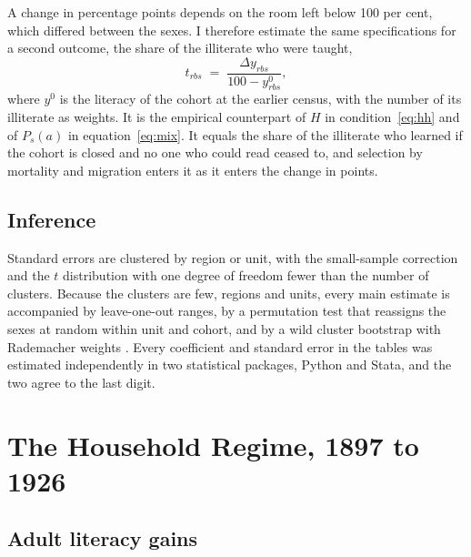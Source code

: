 A change in percentage points depends on the room left below 100 per cent, which differed between the sexes. I therefore estimate the same specifications for a second outcome, the share of the illiterate who were taught,
\begin{equation}\label{eq:taught}
  t_{rbs} \;=\; \frac{\Delta y_{rbs}}{100-y^{0}_{rbs}},
\end{equation}
where $y^{0}$ is the literacy of the cohort at the earlier census, with the number of its illiterate as weights. It is the empirical counterpart of $H$ in condition~\eqref{eq:hh} and of $P_s(a)$ in equation~\eqref{eq:mix}. It equals the share of the illiterate who learned if the cohort is closed and no one who could read ceased to, and selection by mortality and migration enters it as it enters the change in points.

\subsection{Inference}

Standard errors are clustered by region or unit, with the small-sample correction and the $t$ distribution with one degree of freedom fewer than the number of clusters. Because the clusters are few,  regions and  units, every main estimate is accompanied by leave-one-out ranges, by a permutation test that reassigns the sexes at random within unit and cohort, and by a wild cluster bootstrap with Rademacher weights \citep{cameron2008}. Every coefficient and standard error in the tables was estimated independently in two statistical packages, Python and Stata, and the two agree to the last digit.

\FloatBarrier
\section{The Household Regime, 1897 to 1926}\label{sec:wave1}

\subsection{Adult literacy gains}\label{sec:gains1}

